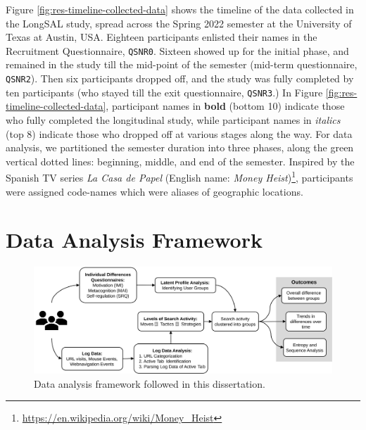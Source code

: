 \documentclass[letterpaper, nobind]{templates/ociamthesis}
\begin{document}
Figure \ref{fig:res-timeline-collected-data} shows the timeline of the data collected in the LongSAL study, spread across the Spring 2022 semester at the University of Texas at Austin, USA.
Eighteen participants enlisted their names in the Recruitment Questionnaire, \texttt{QSNR0}.
Sixteen showed up for the initial phase, and remained in the study till the mid-point of the semester (mid-term questionnaire, \texttt{QSNR2}).
Then six participants dropped off, and the study was fully completed by ten participants (who stayed till the exit questionnaire, \texttt{QSNR3}.)
In Figure \ref{fig:res-timeline-collected-data}, participant names in \textbf{bold} (bottom 10) indicate those who fully completed the longitudinal study,
while participant names in \emph{italics} (top 8) indicate those who dropped off at various stages along the way.
For data analysis, we partitioned the semester duration into three phases, along the green vertical dotted lines:
beginning,
middle, and
end of the semester.
Inspired by the Spanish TV series \emph{La Casa de Papel} (English name: \emph{Money Heist})\footnote{\url{https://en.wikipedia.org/wiki/Money_Heist}}, participants were assigned code-names which were aliases of geographic locations.

\hypertarget{data-analysis-framework}{%
\section{Data Analysis Framework}\label{data-analysis-framework}}

\begin{figure}

{\centering \includegraphics[width=1\linewidth]{figs/data-analysis-framework} 

}

\caption[Data analysis framework.]{Data analysis framework followed in this dissertation.}\label{fig:data-analysis-framework}
\end{figure}
\end{document}
